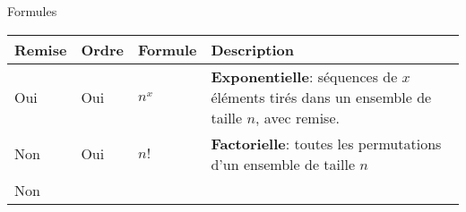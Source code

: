 \documentclass[ignorenonframetext,]{beamer}
\begin{document}
\begin{frame}{Formules}

\begin{longtable}[]{@{}llll@{}}
\toprule
\begin{minipage}[b]{0.11\columnwidth}\raggedright\strut
Remise\strut
\end{minipage} & \begin{minipage}[b]{0.10\columnwidth}\raggedright\strut
Ordre\strut
\end{minipage} & \begin{minipage}[b]{0.16\columnwidth}\raggedright\strut
Formule\strut
\end{minipage} & \begin{minipage}[b]{0.42\columnwidth}\raggedright\strut
Description\strut
\end{minipage}\tabularnewline
\midrule
\endhead
\begin{minipage}[t]{0.11\columnwidth}\raggedright\strut
Oui\strut
\end{minipage} & \begin{minipage}[t]{0.10\columnwidth}\raggedright\strut
Oui\strut
\end{minipage} & \begin{minipage}[t]{0.16\columnwidth}\raggedright\strut
\(n^x\)\strut
\end{minipage} & \begin{minipage}[t]{0.42\columnwidth}\raggedright\strut
\textbf{Exponentielle}: séquences de \(x\) éléments tirés dans un
ensemble de taille \(n\), avec remise.\strut
\end{minipage}\tabularnewline
\begin{minipage}[t]{0.11\columnwidth}\raggedright\strut
Non\strut
\end{minipage} & \begin{minipage}[t]{0.10\columnwidth}\raggedright\strut
Oui\strut
\end{minipage} & \begin{minipage}[t]{0.16\columnwidth}\raggedright\strut
\(n!\)\strut
\end{minipage} & \begin{minipage}[t]{0.42\columnwidth}\raggedright\strut
\textbf{Factorielle}: toutes les permutations d'un ensemble de taille
\(n\)\strut
\end{minipage}\tabularnewline
\begin{minipage}[t]{0.11\columnwidth}\raggedright\strut
Non\strut
\end{minipage} & \begin{minipage}[t]{0.10\columnwidth}\raggedright\strut

\end{minipage}
\end{longtable}
\end{frame}
\end{document}
